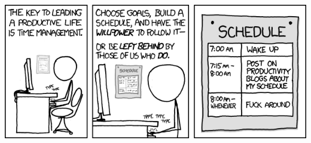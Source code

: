 \vfill

\begin{center}
\includegraphics[width=0.8\hsize]{shared/xkcd/time_management.png}
\end{center}
